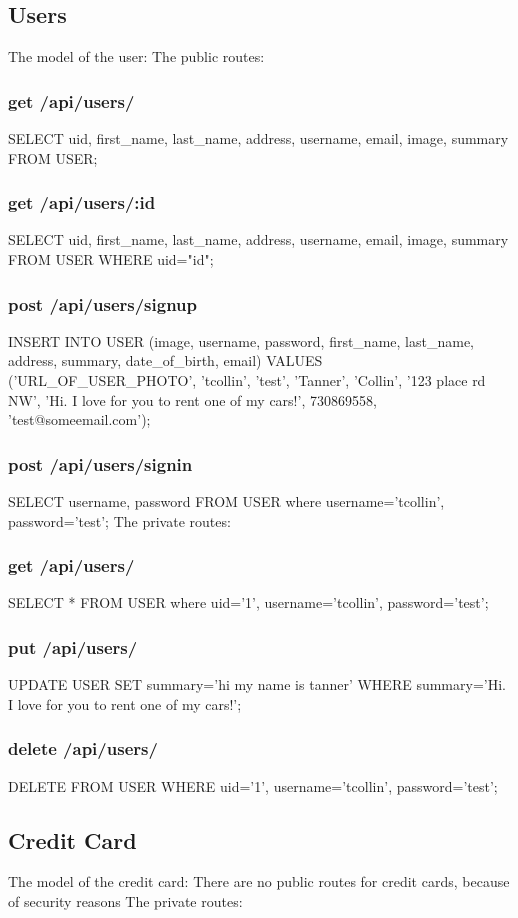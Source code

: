 \documentclass{article}
\begin{document}
\subsection{Users}
The model of the user:
The public routes:
\subsubsection{get /api/users/}
SELECT uid, first_name, last_name, address, username, email, image, summary FROM USER;
\subsubsection{get /api/users/:id}
SELECT uid, first_name, last_name, address, username, email, image, summary FROM USER WHERE uid="id";
\subsubsection{post /api/users/signup}
INSERT INTO USER (image, username, password, first_name, last_name, address, summary, date_of_birth, email)
VALUES ('URL_OF_USER_PHOTO', 'tcollin', 'test', 'Tanner', 'Collin', '123 place rd NW', 'Hi. I love for you to rent one of my cars!', 730869558, 'test@someemail.com');
\subsubsection{post /api/users/signin}
SELECT username, password FROM USER where username='tcollin', password='test';
The private routes:
\subsubsection{get /api/users/}
SELECT * FROM USER where uid='1', username='tcollin', password='test';
\subsubsection{put /api/users/}
UPDATE USER SET summary='hi my name is tanner' WHERE summary='Hi. I love for you to rent one of my cars!';
\subsubsection{delete /api/users/}
DELETE FROM USER WHERE uid='1', username='tcollin', password='test';

\subsection{Credit Card}
The model of the credit card:
There are no public routes for credit cards, because of security reasons
The private routes:
\end{document}
